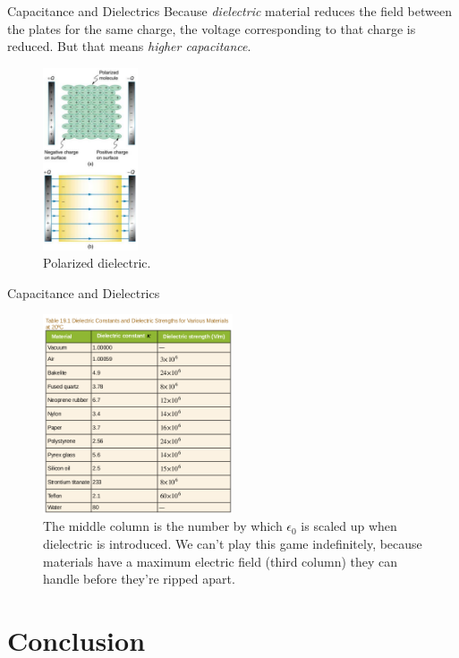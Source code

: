 \documentclass{beamer}
\begin{document}
\begin{frame}{Capacitance and Dielectrics}
Because \textit{dielectric} material reduces the field between the plates for the same charge, the voltage corresponding to that charge is reduced.  But that means \textit{higher capacitance}.
\begin{figure}
\centering
\includegraphics[width=0.25\textwidth]{figures/polar.png}
\caption{\label{fig:polar} Polarized dielectric.}
\end{figure}
\end{frame}

\begin{frame}{Capacitance and Dielectrics}
\begin{figure}
\centering
\includegraphics[width=0.5\textwidth]{figures/tableK.png}
\caption{\label{fig:tab} The middle column is the number by which $\epsilon_0$ is scaled up when dielectric is introduced.  We can't play this game indefinitely, because materials have a maximum electric field (third column) they can handle before they're ripped apart.}
\end{figure}
\end{frame}

\section{Conclusion}
\end{document}
